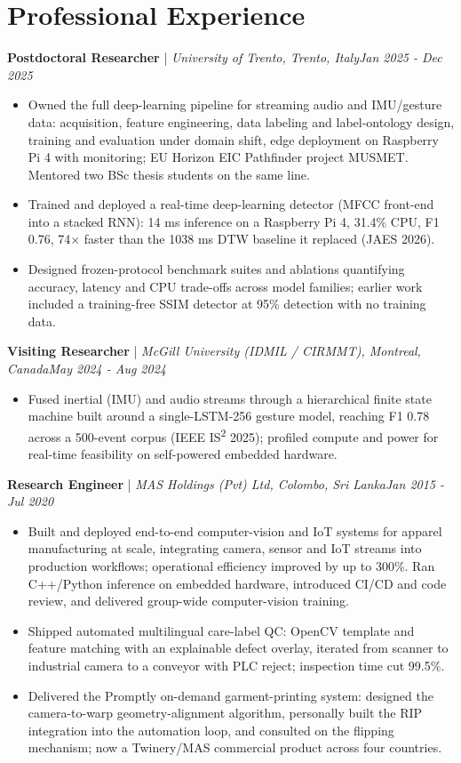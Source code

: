 \documentclass[11pt]{article}
\newenvironment{cvrole}[5]{%
  \par\noindent\textbf{\large #1} | \textit{\small #2, #3}\hfill \textit{\small #4 - #5}\par
  \begin{itemize}[leftmargin=2em, itemsep=-0.3em, topsep=-0.5em]%
}{%
  \end{itemize}\par\noindent\mbox{}\par\vspace{0.1em}%
}
\begin{document}
\section*{Professional Experience}

\begin{cvrole}{Postdoctoral Researcher}{University of Trento}{Trento, Italy}{Jan 2025}{Dec 2025}
    \item Owned the full deep-learning pipeline for streaming audio and IMU/gesture data: acquisition, feature engineering, data labeling and label-ontology design, training and evaluation under domain shift, edge deployment on Raspberry Pi 4 with monitoring; EU Horizon EIC Pathfinder project MUSMET. Mentored two BSc thesis students on the same line.
    \item Trained and deployed a real-time deep-learning detector (MFCC front-end into a stacked RNN): 14 ms inference on a Raspberry Pi 4, 31.4\% CPU, F1 0.76, 74$\times$ faster than the 1038 ms DTW baseline it replaced (JAES 2026).
    \item Designed frozen-protocol benchmark suites and ablations quantifying accuracy, latency and CPU trade-offs across model families; earlier work included a training-free SSIM detector at 95\% detection with no training data.
\end{cvrole}

\begin{cvrole}{Visiting Researcher}{McGill University (IDMIL / CIRMMT)}{Montreal, Canada}{May 2024}{Aug 2024}
    \item Fused inertial (IMU) and audio streams through a hierarchical finite state machine built around a single-LSTM-256 gesture model, reaching F1 0.78 across a 500-event corpus (IEEE IS\textsuperscript{2} 2025); profiled compute and power for real-time feasibility on self-powered embedded hardware.
\end{cvrole}

\begin{cvrole}{Research Engineer}{MAS Holdings (Pvt) Ltd}{Colombo, Sri Lanka}{Jan 2015}{Jul 2020}
    \item Built and deployed end-to-end computer-vision and IoT systems for apparel manufacturing at scale, integrating camera, sensor and IoT streams into production workflows; operational efficiency improved by up to 300\%. Ran C++/Python inference on embedded hardware, introduced CI/CD and code review, and delivered group-wide computer-vision training.
    \item Shipped automated multilingual care-label QC: OpenCV template and feature matching with an explainable defect overlay, iterated from scanner to industrial camera to a conveyor with PLC reject; inspection time cut 99.5\%.
    \item Delivered the Promptly on-demand garment-printing system: designed the camera-to-warp geometry-alignment algorithm, personally built the RIP integration into the automation loop, and consulted on the flipping mechanism; now a Twinery/MAS commercial product across four countries.
\end{cvrole}
\end{document}
